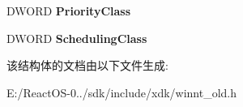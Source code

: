 \begin{DoxyCompactItemize}
\item 
\mbox{\label{struct___j_o_b_o_b_j_e_c_t___b_a_s_i_c___l_i_m_i_t___i_n_f_o_r_m_a_t_i_o_n_a5385661ed980ab72f2d3049b6638b2c8}} 
D\+W\+O\+RD {\bfseries Priority\+Class}
\item 
\mbox{\label{struct___j_o_b_o_b_j_e_c_t___b_a_s_i_c___l_i_m_i_t___i_n_f_o_r_m_a_t_i_o_n_a28e273a7be5a46429dc756dfd7bf69ec}} 
D\+W\+O\+RD {\bfseries Scheduling\+Class}
\end{DoxyCompactItemize}


该结构体的文档由以下文件生成\+:\begin{DoxyCompactItemize}
\item 
E\+:/\+React\+O\+S-\/0../sdk/include/xdk/winnt\+\_\+old.\+h\end{DoxyCompactItemize}
